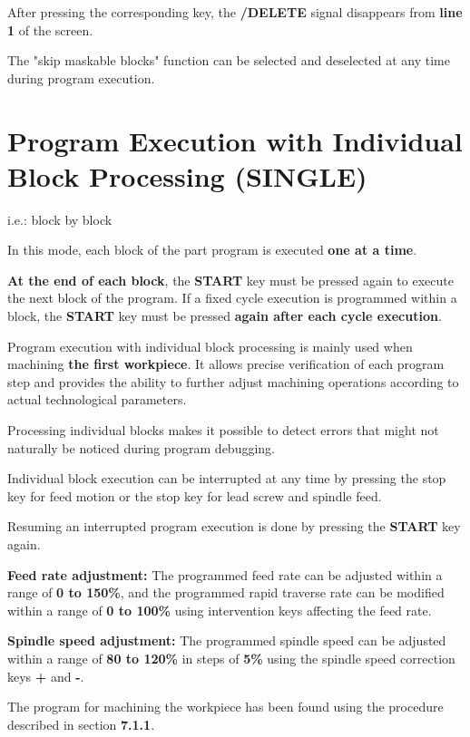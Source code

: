 After pressing the corresponding key, the \textbf{/DELETE} signal disappears from \textbf{line 1} of the screen.

\notes

The "skip maskable blocks" function can be selected and deselected at any time during program execution.

\newpage

\section{Program Execution with Individual Block Processing (SINGLE)}

i.e.: block by block

In this mode, each block of the part program is executed \textbf{one at a time}.

\textbf{At the end of each block}, the \textbf{START} key must be pressed again to execute the next block of the program.  
If a fixed cycle execution is programmed within a block, the \textbf{START} key must be pressed \textbf{again after each cycle execution}.

Program execution with individual block processing is mainly used when machining \textbf{the first workpiece}.  
It allows precise verification of each program step and provides the ability to further adjust machining operations according to actual technological parameters.

Processing individual blocks makes it possible to detect errors that might not naturally be noticed during program debugging.

Individual block execution can be interrupted at any time by pressing the stop key for feed motion or the stop key for lead screw and spindle feed.

Resuming an interrupted program execution is done by pressing the \textbf{START} key again.

\textbf{Feed rate adjustment:}  
The programmed feed rate can be adjusted within a range of \textbf{0 to 150\%},  
and the programmed rapid traverse rate can be modified within a range of \textbf{0 to 100\%} using intervention keys affecting the feed rate.

\textbf{Spindle speed adjustment:}  
The programmed spindle speed can be adjusted within a range of \textbf{80 to 120\%} in steps of \textbf{5\%} using the spindle speed correction keys \textbf{+} and \textbf{-}.
\newpage
\procedure

The program for machining the workpiece has been found using the procedure described in section \textbf{7.1.1}.

